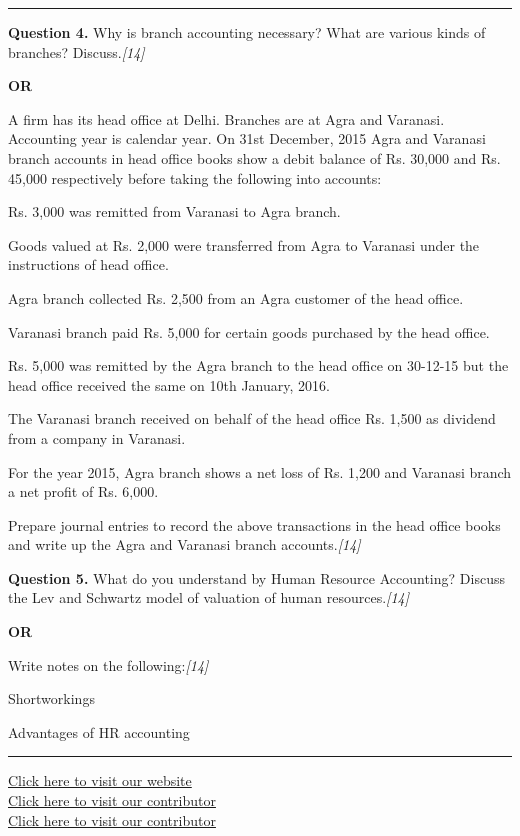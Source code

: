 \documentclass[11pt,a4paper]{article}
\newcommand{\pts}[1]{\hfill   \textit{[#1]}}
\begin{document}
\medskip\rule{\linewidth}{0.2pt}




\noindent   \textbf{Question 4.}
Why is branch accounting necessary? What are various kinds of branches? Discuss.\pts{14}

\centerline{   \textbf{OR}}

A firm has its head office at Delhi. Branches are at Agra and Varanasi. Accounting year is calendar year. On 31st December, 2015 Agra and Varanasi branch accounts in head office books show a debit balance of Rs. 30,000 and Rs. 45,000 respectively before taking the following into accounts:

\begin{parts}
  \item Rs. 3,000 was remitted from Varanasi to Agra branch.
  \item Goods valued at Rs. 2,000 were transferred from Agra to Varanasi under the instructions of head office.
  \item Agra branch collected Rs. 2,500 from an Agra customer of the head office.
  \item Varanasi branch paid Rs. 5,000 for certain goods purchased by the head office.
  \item Rs. 5,000 was remitted by the Agra branch to the head office on 30-12-15 but the head office received the same on 10th January, 2016.
  \item The Varanasi branch received on behalf of the head office Rs. 1,500 as dividend from a company in Varanasi.
  \item For the year 2015, Agra branch shows a net loss of Rs. 1,200 and Varanasi branch a net profit of Rs. 6,000.
\end{parts}
Prepare journal entries to record the above transactions in the head office books and write up the Agra and Varanasi branch accounts.\pts{14}

\pagebreak




\noindent   \textbf{Question 5.}
What do you understand by Human Resource Accounting? Discuss the Lev and Schwartz model of valuation of human resources.\pts{14}

\centerline{   \textbf{OR}}

Write notes on the following:\pts{14}

\begin{parts}
  \item Shortworkings
  \item Advantages of HR accounting
\end{parts}

\vfill
\rule{\linewidth}{0.4pt}

\begin{center}\small
\href{https://bhu-exam.vercel.app/}{Click here to visit our website}\\[4pt]
\href{https://me-aryan.vercel.app/}{Click here to visit our contributor}\\[4pt]
\href{https://quashan-me.vercel.app/}{Click here to visit our contributor}
\end{center}
\end{document}
